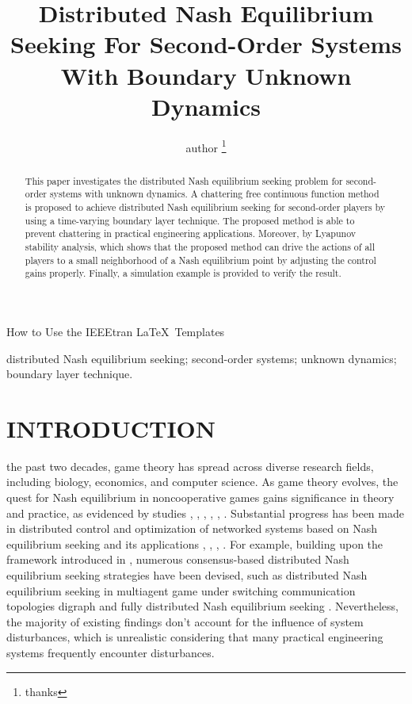 \documentclass[lettersize,journal]{IEEEtran}
\begin{document}
\title{Distributed Nash Equilibrium Seeking For Second-Order Systems With Boundary Unknown Dynamics}
\author{author
    \thanks{thanks}}

%
{How to Use the IEEEtran \LaTeX \ Templates}

\maketitle

\begin{abstract}
    This paper investigates the distributed Nash equilibrium seeking problem for second-order systems with unknown dynamics. A chattering free continuous function method is proposed to achieve distributed Nash equilibrium seeking for second-order players by using a time-varying boundary layer technique. The proposed method is able to prevent chattering in practical engineering applications.
    Moreover, by Lyapunov stability analysis, which shows that the proposed method can drive the actions of all players to a small neighborhood of a Nash equilibrium point by adjusting the control gains properly. Finally, a simulation example is provided to verify the result.
\end{abstract}

\begin{IEEEkeywords}
    distributed Nash equilibrium seeking; second-order systems; unknown dynamics; boundary layer technique.
\end{IEEEkeywords}


\section{INTRODUCTION}
the past two decades, game theory has spread across diverse research fields, including biology, economics, and computer science. As game theory evolves, the quest for Nash equilibrium in noncooperative games gains significance in theory and practice, as evidenced by studies \cite{pozo2011finding}, \cite{ratliff2016characterization}, \cite{lou2015nash}, \cite{stankovic2011distributed}, \cite{liu2011stochastic}, \cite{durr2013lie}.
Substantial progress has been made in distributed control and optimization of networked systems based on Nash equilibrium seeking and its applications \cite{ding2019distributed}, \cite{wu2021resilient}, \cite{ge2021dynamic}, \cite{ye2022distributed}.
For example, building upon the framework introduced in \cite{7888532}, numerous consensus-based distributed Nash equilibrium seeking strategies have been devised, such as distributed Nash equilibrium seeking in multiagent game under switching communication topologies digraph \cite{8093754} and fully distributed Nash equilibrium seeking \cite{ye2021adaptive}. Nevertheless, the majority of existing findings don't account for the influence of system disturbances, which is unrealistic considering that many practical engineering systems frequently encounter disturbances.
\end{document}

